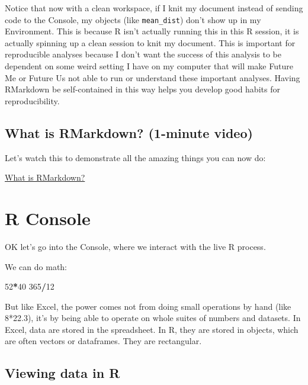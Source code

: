 \documentclass[]{book}
\newenvironment{Shaded}{\begin{snugshade}}{\end{snugshade}}
\newcommand{\DecValTok}[1]{\textcolor[rgb]{0.00,0.00,0.81}{#1}}
\newcommand{\OperatorTok}[1]{\textcolor[rgb]{0.81,0.36,0.00}{\textbf{#1}}}
\begin{document}
Notice that now with a clean workspace, if I knit my document instead of sending code to the Console, my objects (like \texttt{mean\_dist}) don't show up in my Environment. This is because R isn't actually running this in this R session, it is actually spinning up a clean session to knit my document. This is important for reproducible analyses because I don't want the success of this analysis to be dependent on some weird setting I have on my computer that will make Future Me or Future Us not able to run or understand these important analyses. Having RMarkdown be self-contained in this way helps you develop good habits for reproducibility.

\hypertarget{what-is-rmarkdown-1-minute-video}{%
\subsection{What is RMarkdown? (1-minute video)}\label{what-is-rmarkdown-1-minute-video}}

Let's watch this to demonstrate all the amazing things you can now do:

\href{https://vimeo.com/178485416}{What is RMarkdown?}

\hypertarget{r-console}{%
\section{R Console}\label{r-console}}

OK let's go into the Console, where we interact with the live R process.

We can do math:

\begin{Shaded}
\begin{Highlighting}[]
\DecValTok{52}\OperatorTok{*}\DecValTok{40}
\DecValTok{365}\OperatorTok{/}\DecValTok{12}
\end{Highlighting}
\end{Shaded}

But like Excel, the power comes not from doing small operations by hand (like 8*22.3), it's by being able to operate on whole suites of numbers and datasets. In Excel, data are stored in the spreadsheet. In R, they are stored in objects, which are often vectors or dataframes. They are rectangular.

\hypertarget{viewing-data-in-r}{%
\subsection{Viewing data in R}\label{viewing-data-in-r}}
\end{document}
